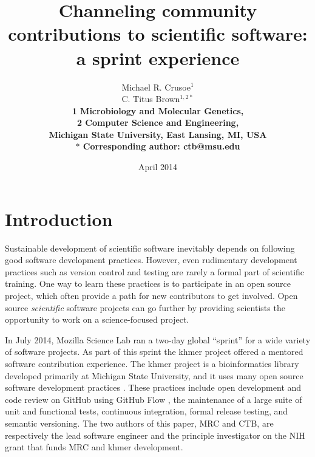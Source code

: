 \documentclass[11pt]{article}
\date{April 2014}
\title{Channeling community contributions to scientific software: a sprint experience}
\author{Michael R. Crusoe$^{1}$\\
C. Titus Brown$^{1,2\ast}$\\
\small \bf{1} Microbiology and Molecular Genetics,\\
\small \bf{2} Computer Science and Engineering,\\
\small Michigan State University, East Lansing, MI, USA\\
\small $\ast$ Corresponding author: ctb@msu.edu}
\begin{document}
\maketitle
\thispagestyle{firststyle}


\setlength{\parindent}{0pt}
\setlength{\parindent}{0pt}
\setlength{\parskip}{0.70ex}

\section{Introduction}

Sustainable development of scientific software inevitably depends on
following good software development practices.  However, even
rudimentary development practices such as version control and testing
are rarely a formal part of scientific training.  One way to learn
these practices is to participate in an open source project, which
often provide a path for new contributors to get involved.  Open
source {\em scientific} software projects can go further by providing
scientists the opportunity to work on a science-focused project.

In July 2014, Mozilla Science Lab ran a two-day global ``sprint'' for
a wide variety of software projects. As part of this sprint the khmer
project offered a mentored software contribution experience.  The
khmer project is a bioinformatics library developed primarily at
Michigan State University, and it uses many open source software
development practices \cite{khmer,2013-wssspe13}.  These practices include
open development and code review on GitHub using GitHub Flow
\cite{githubflow}, the maintenance of a large suite of unit and
functional tests, continuous integration, formal release testing, and
semantic versioning.  The two authors of this paper, MRC and CTB, are
respectively the lead software engineer and the principle investigator
on the NIH grant that funds MRC and khmer development.
\end{document}
